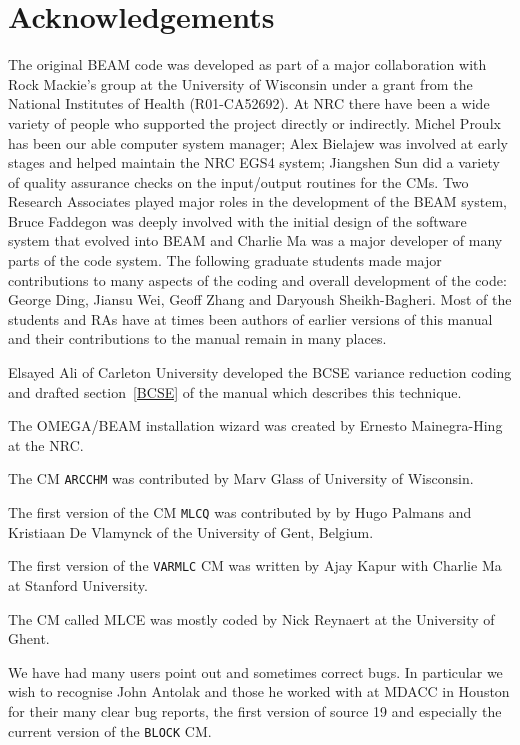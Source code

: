 \documentclass[12pt,twoside]{article}
\begin{document}
\vspace{1.5cm}

\section{Acknowledgements}

The original BEAM code was developed as part of a major collaboration with Rock
Mackie's group at the University of Wisconsin under a grant from the
National Institutes of Health (R01-CA52692).  At NRC there have been a wide
variety of people who supported the project directly or indirectly.
Michel Proulx has been our able computer system manager; Alex Bielajew was
involved at early
stages and helped maintain the NRC EGS4 system; Jiangshen Sun did a
variety of quality assurance checks on the input/output routines for the
CMs.  Two Research Associates played major roles in the development of the
BEAM system,  Bruce Faddegon was deeply involved with the initial design of the
software system that evolved into BEAM and Charlie Ma was a major developer of
many parts of the code system. The following graduate students
made major contributions to many aspects of the coding and overall
development of the code: George Ding, Jiansu Wei, Geoff Zhang and Daryoush
Sheikh-Bagheri.  Most of the students and RAs have at times been authors of
earlier versions of this manual and their contributions to the manual
remain in many places.

Elsayed Ali of Carleton University developed the BCSE variance reduction
coding and drafted section~\ref{BCSE} of the manual which describes
this technique.

The OMEGA/BEAM installation wizard was created by Ernesto Mainegra-Hing
at the NRC.

The CM {\tt ARCCHM}  was contributed by Marv Glass of University of
Wisconsin.

The first version of the CM {\tt MLCQ} was contributed by  by Hugo
Palmans and Kristiaan De Vlamynck of the University of Gent, Belgium.

The first version of the {\tt VARMLC} CM was written by Ajay
Kapur with Charlie Ma at Stanford University.

The CM called MLCE was mostly coded by Nick Reynaert at the
University of Ghent.

We have had many users point out and sometimes correct bugs.  In particular
we wish to recognise John Antolak and those he worked with at MDACC in
Houston for their many clear bug reports, the first version of
source 19 and especially the current version of
the {\tt BLOCK} CM.
\end{document}
